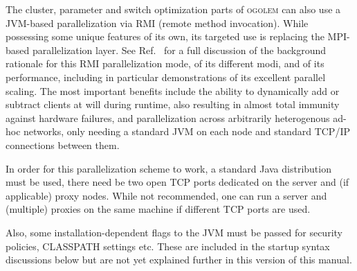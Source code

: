 \documentclass[a4paper,10pt]{scrbook}
\newcommand{\ogo}{\textsc{ogolem}}
\begin{document}
The cluster, parameter and switch optimization parts of \ogo{} can also use a 
JVM-based parallelization via RMI (remote method invocation). While possessing
some unique features of its own, its targeted use is replacing the MPI-based
parallelization layer. See Ref.~ for a full discussion of the
background rationale for this RMI parallelization mode, of its different modi,
and of its performance, including in particular demonstrations of its
excellent parallel scaling. The most important
benefits include the ability to dynamically add or subtract clients at will
during runtime, also resulting in almost total immunity against hardware
failures, and parallelization across arbitrarily heterogenous ad-hoc networks,
only needing a standard JVM on each node and standard TCP/IP connections
between them.

In order for this parallelization scheme to work, a standard Java distribution 
must be used, there need be two open TCP ports dedicated on the server and 
(if applicable) proxy nodes. While not recommended, one can run a server and
(multiple) proxies on the same machine if different TCP ports are used.

Also, some installation-dependent flags to the JVM must be passed for security 
policies, CLASSPATH settings etc. These are included in the startup syntax
discussions below but are not yet explained further in this version of this
manual. 
\end{document}
